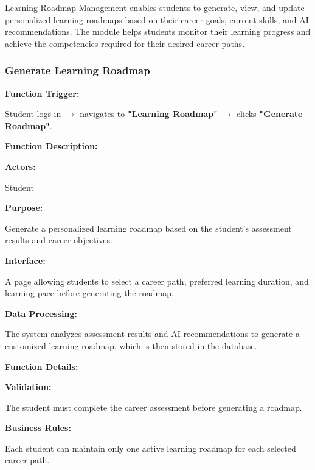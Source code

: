 Learning Roadmap Management enables students to generate, view, and update personalized learning roadmaps based on their career goals, current skills, and AI recommendations. The module helps students monitor their learning progress and achieve the competencies required for their desired career paths.
\subsubsection{Generate Learning Roadmap}

\textbf{Function Trigger:}

Student logs in $\rightarrow$ navigates to \textbf{"Learning Roadmap"} $\rightarrow$ clicks \textbf{"Generate Roadmap"}.

\vspace{0.3cm}

\textbf{Function Description:}

\textbf{Actors:}

Student

\vspace{0.2cm}

\textbf{Purpose:}

Generate a personalized learning roadmap based on the student's assessment results and career objectives.

\vspace{0.2cm}

\textbf{Interface:}

A page allowing students to select a career path, preferred learning duration, and learning pace before generating the roadmap.

\vspace{0.2cm}

\textbf{Data Processing:}

The system analyzes assessment results and AI recommendations to generate a customized learning roadmap, which is then stored in the database.

\vspace{0.3cm}

\textbf{Function Details:}

\textbf{Validation:}

The student must complete the career assessment before generating a roadmap.

\textbf{Business Rules:}

Each student can maintain only one active learning roadmap for each selected career path.

